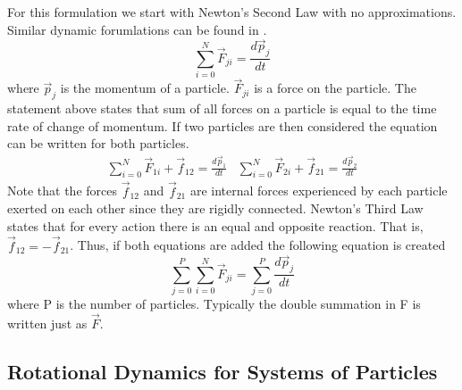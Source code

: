 \documentclass{article}
\begin{document}
For this formulation we start with Newton's Second Law with no
approximations. Similar dynamic forumlations can be found in \cite{etkins,
  phil,nelson,astrodynamics}.
\begin{equation}
\sum\limits_{i=0}^N \vec{F}_{ji} = \frac{d\vec{p}_j}{dt}
\end{equation}
where $\vec{p}_j$ is the momentum of a particle. $\vec{F}_{ji}$ is a
force on the particle. The statement above states that sum of all
forces on a particle is equal to the time rate of change of
momentum. If two particles are then considered the equation can
be written for both particles.
\begin{equation}
\begin{matrix}
\sum\limits_{i=0}^N \vec{F}_{1i} + \vec{f}_{12} = \frac{d\vec{p}_1}{dt} &
\sum\limits_{i=0}^N \vec{F}_{2i} + \vec{f}_{21} = \frac{d\vec{p}_2}{dt} 
\end{matrix}
\end{equation}
Note that the forces $\vec{f}_{12}$ and $\vec{f}_{21}$ are internal forces
experienced by each particle exerted on each other since they are
rigidly connected. Newton's Third Law states that for every action
there is an equal and opposite reaction. That is, $\vec{f}_{12} = -\vec{f}_{21}$. Thus, if both equations are added the following equation is
created
\begin{equation}
\sum\limits_{j=0}^P \sum\limits_{i=0}^N \vec{F}_{ji} =
\sum\limits_{j=0}^P \frac{d\vec{p}_j}{dt}
\end{equation}
where P is the number of particles. Typically the double summation
in F is written just as $\vec{F}$.

\subsection{Rotational Dynamics for Systems of Particles}
\end{document}
